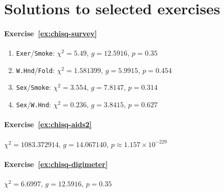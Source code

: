 \section{Solutions to selected exercises}
\label{sec:chi-squared-solutions}

\paragraph{Exercise~\ref{ex:chisq-survey}}

\begin{enumerate}
  \item \texttt{Exer}/\texttt{Smoke}: $\chi^2 = 5.49$, $g = 12.5916$, $p = 0.35$
  \item \texttt{W.Hnd}/\texttt{Fold}: $\chi^2 = 1.581399$, $g = 5.9915$, $p = 0.454$
  \item \texttt{Sex}/\texttt{Smoke}: $\chi^2 = 3.554$, $g = 7.8147$, $p = 0.314$
  \item \texttt{Sex}/\texttt{W.Hnd}: $\chi^2 = 0.236$, $g = 3.8415$, $p = 0.627$
\end{enumerate}

\paragraph{Exercise~\ref{ex:chisq-aids2}} $\chi^2 = 1083.372914$, $g = 14.067140$, $p \approx 1.157 \times 10^{-229}$

\paragraph{Exercise~\ref{ex:chisq-digimeter}} $\chi^2 = 6.6997$, $g = 12.5916$, $p = 0.35$